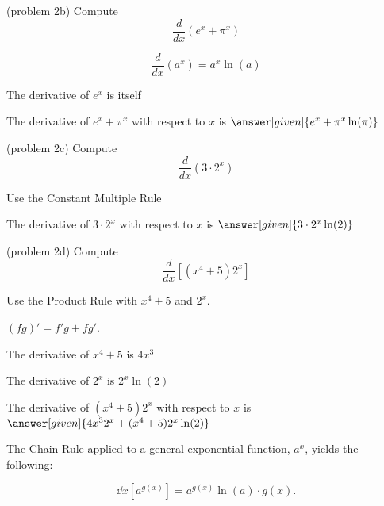 \documentclass{ximera}
\begin{document}
\begin{problem}(problem 2b)
  Compute 
  \[
  \frac{d}{dx} \left(e^x + \pi^x\right)
  \]
  
    \begin{hint}
      \[
      \frac{d}{dx} \left(a^x\right) = a^x \ln(a)
      \]
    \end{hint}
		\begin{hint}
		  The derivative of $e^x$ is itself
		\end{hint}
		The derivative of $e^x + \pi^x$ with respect to $x$ is
		 $\answer[given]{e^x  + \pi^x \ln(\pi)}$
	
\end{problem}


\begin{problem}(problem 2c)
  Compute 
  \[
  \frac{d}{dx} \left(3\cdot 2^x\right)
  \]
    
    \begin{hint}
		  Use the Constant Multiple Rule
		\end{hint}
    
		
		The derivative of $3\cdot 2^x$ with respect to $x$ is
		 $\answer[given]{3\cdot 2^x \ln(2)}$
	
\end{problem}



\begin{problem}(problem 2d)
  Compute
  \[
  \frac{d}{dx} \left[(x^4 + 5)2^x\right]
  \]
  
    \begin{hint}
      Use the Product Rule with $x^4 + 5$ and $2^x$.
    \end{hint}
    \begin{hint}
      $(fg)' = f'g+fg'$.
    \end{hint}
    \begin{hint}
      The derivative of $x^4 + 5$ is $4x^3$
    \end{hint}
    \begin{hint}
      The derivative of $2^x$ is $2^x \ln(2)$
    \end{hint}
		The derivative of $(x^4 + 5)2^x$ with respect to $x$ is
		 $\answer[given]{4x^3 2^x + (x^4 + 5) 2^x \ln(2)}$
		
\end{problem}


The Chain Rule applied to a general exponential function, $a^x$, yields the following:

\[
\dd{x} \left[a^{g(x)}\right] = a^{g(x)} \ln(a) \cdot g(x).
\]
\end{document}
